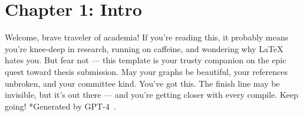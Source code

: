 \chapter{Chapter 1: Intro}
\label{ch:intro1-1}
Welcome, brave traveler of academia! If you're reading this, it probably means you're knee-deep in research, running on caffeine, and wondering why LaTeX hates you. But fear not — this template is your trusty companion on the epic quest toward thesis submission. May your graphs be beautiful, your references unbroken, and your committee kind. You’ve got this. The finish line may be invisible, but it’s out there — and you're getting closer with every compile. Keep going! *Generated by GPT-4~\cite{achiam2023gpt}.

